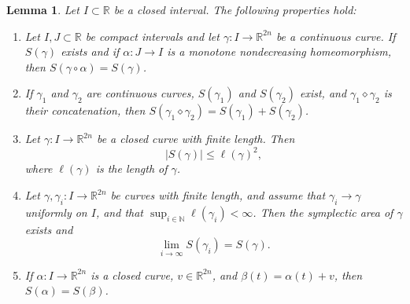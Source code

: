 \documentclass[12pt,reqno]{amsart}
\newcommand{\R}{\mathbb{R}}
\newcommand{\from}{\colon}
\newtheorem{lemma}[thm]{Lemma}
\theoremstyle{remark}
\newcommand{\0}{\mathbf{0}}
\renewcommand{\1}{\mathbf 1}
\begin{document}
\begin{lemma}\label{lem:symplectic-area-props-v2}   Let $I\subset \R$ be a closed interval. The following properties hold:
  \begin{enumerate}
  \item Let $I,J\subset \R$ be compact intervals and let $\gamma\from I\to\mathbb R^{2n}$ be a continuous curve. If $S(\gamma)$ exists and if $\alpha\from J\to I$ is a monotone nondecreasing homeomorphism, then $S(\gamma\circ \alpha) = S(\gamma)$.
  \item If $\gamma_1$ and $\gamma_2$ are continuous curves, $S(\gamma_1)$ and $S(\gamma_2)$ exist, and $\gamma_1\diamond \gamma_2$ is their concatenation, then $S(\gamma_1\diamond \gamma_2) = S(\gamma_1)+S(\gamma_2)$.
  \item Let $\gamma\from I\to\mathbb R^{2n}$ be a closed curve with finite length. Then 
  \[
  |S(\gamma)|\le \ell(\gamma)^2,
  \]
  where $\ell(\gamma)$ is the length of $\gamma$.
  \item Let $\gamma,\gamma_i\from I\to\mathbb R^{2n}$ be curves with finite length, and assume that $\gamma_i\to\gamma$ uniformly on $I$, and that $\sup_{i\in\mathbb N}\ell(\gamma_i)<\infty$. Then the symplectic area of $\gamma$ exists and
  \[
  \lim_{i\to\infty}S(\gamma_i)=S(\gamma).
  \]
\item If $\alpha\from I\to \R^{2n}$ is a closed curve, $v\in \R^{2n}$, and $\beta(t) = \alpha(t) + v$, then $S(\alpha) = S(\beta)$.
  \end{enumerate}
\end{lemma}
\end{document}
